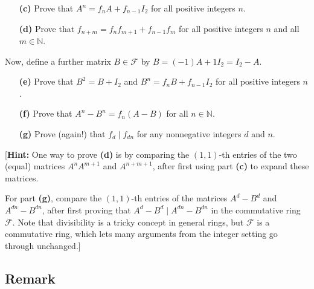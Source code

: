 \documentclass[paper=a4, fontsize=12pt]{scrartcl} %
\newcommand{\NN}{\mathbb{N}} %
\newcommand{\tup}[1]{\left( #1 \right)}
\newcommand{\calF}{\mathcal{F}}
\theoremstyle{plainsl}
\theoremstyle{definition}
\theoremstyle{remark}
\begin{document}
\begin{enumerate}

\item[\textbf{(c)}]
Prove that $A^n = f_n A + f_{n-1} I_2$ for all positive
integers $n$.

\item[\textbf{(d)}]
Prove that
$f_{n+m} = f_n f_{m+1} + f_{n-1} f_m$ for all positive
integers $n$ and all $m \in \NN$.

\end{enumerate}

Now, define a further matrix $B \in \calF$ by
$B = \tup{-1}A + 1I_2 = I_2 - A$.

\begin{enumerate}

\item[\textbf{(e)}]
Prove that $B^2 = B + I_2$ and
$B^n = f_n B + f_{n-1} I_2$ for all positive
integers $n$.

\item[\textbf{(f)}]
Prove that
$A^n - B^n = f_n \tup{A - B}$ for all $n \in \NN$.

\item[\textbf{(g)}]
Prove (again!) that $f_d \mid f_{dn}$ for any nonnegative
integers $d$ and $n$.

\end{enumerate}

[\textbf{Hint:} One way to prove \textbf{(d)} is by
comparing the $\tup{1, 1}$-th entries of the two
(equal) matrices $A^n A^{m+1}$ and $A^{n+m+1}$, after
first using part \textbf{(c)} to expand these matrices.

For part \textbf{(g)}, compare the $\tup{1, 1}$-th
entries of the matrices $A^d - B^d$ and $A^{dn} - B^{dn}$,
after first proving that $A^d - B^d \mid A^{dn} - B^{dn}$ in
the commutative ring $\calF$.
Note that divisibility is a tricky concept in general
rings, but $\calF$ is a commutative ring, which lets
many arguments from the integer setting go
through unchanged.]

\subsection{Remark}
\end{document}
